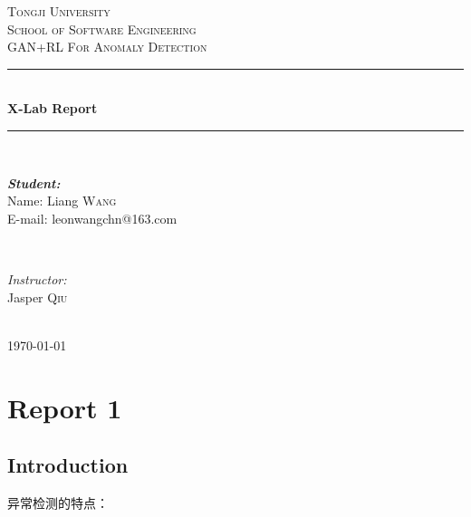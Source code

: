 \documentclass[12pt]{article}
\begin{document}
\begin{titlepage}

\newcommand{\HRule}{\rule{\linewidth}{0.5mm}} %

\center %

\textsc{\LARGE Tongji University}\\[1.5cm]
\textsc{\Large School of Software Engineering}\\[0.5cm]
\textsc{\large GAN+RL For Anomaly Detection}\\[0.5cm]

\HRule \\[0.4cm]
{ \huge \bfseries X-Lab Report}\\[0.4cm] %
\HRule \\[1.5cm]

\begin{minipage}{0.5\textwidth}
\begin{flushleft} \large
\emph{\textbf{Student:}}\\
Name: Liang \textsc{Wang} \\
E-mail: leonwangchn@163.com \\
\end{flushleft}
\end{minipage}
~
\begin{minipage}{0.4\textwidth}
\begin{flushright} \large
\emph{Instructor:} \\
Jasper \textsc{Qiu}
\end{flushright}
\end{minipage}\\[2cm]


{\large \today}\\[2cm]


\vfill %

\end{titlepage}

\tableofcontents


\newpage

\section{Report 1}

\subsection{\textbf{Introduction}}
异常检测的特点：
\end{document}
